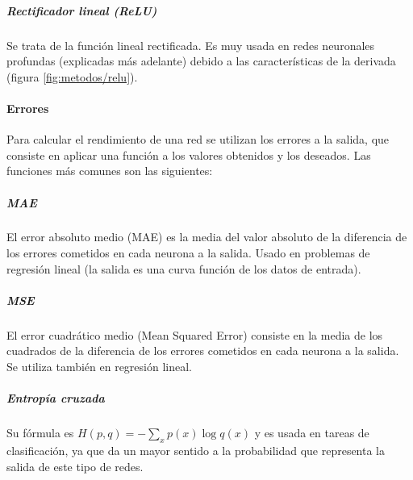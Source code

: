 \subparagraph{Rectificador lineal (ReLU)}
Se trata de la función lineal rectificada. Es muy usada en redes neuronales profundas (explicadas más adelante) debido a las características de la derivada (figura \ref{fig:metodos/relu}).

\paragraph{Errores}
Para calcular el rendimiento de una red se utilizan los errores a la salida, que consiste en aplicar una función a los valores obtenidos y los deseados. Las funciones más comunes son las siguientes:

\subparagraph{MAE}
El error absoluto medio (MAE) es la media del valor absoluto de la diferencia de los errores cometidos en cada neurona a la salida. Usado en problemas de regresión lineal (la salida es una curva función de los datos de entrada).
\subparagraph{MSE}
El error cuadrático medio (Mean Squared Error) consiste en la media de los cuadrados de la diferencia de los errores cometidos en cada neurona a la salida. Se utiliza también en regresión lineal.
\subparagraph{Entropía cruzada}
Su fórmula es $H(p, q) = -\sum_{x}{p(x)\log q(x)}$ y es usada en tareas de clasificación, ya que da un mayor sentido a la probabilidad que representa la salida de este tipo de redes.

